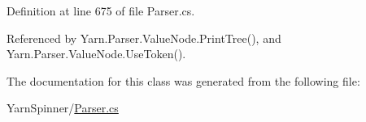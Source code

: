 Definition at line 675 of file Parser.\-cs.



Referenced by Yarn.\-Parser.\-Value\-Node.\-Print\-Tree(), and Yarn.\-Parser.\-Value\-Node.\-Use\-Token().



The documentation for this class was generated from the following file\-:\begin{DoxyCompactItemize}
\item 
Yarn\-Spinner/\hyperlink{a00316}{Parser.\-cs}\end{DoxyCompactItemize}
